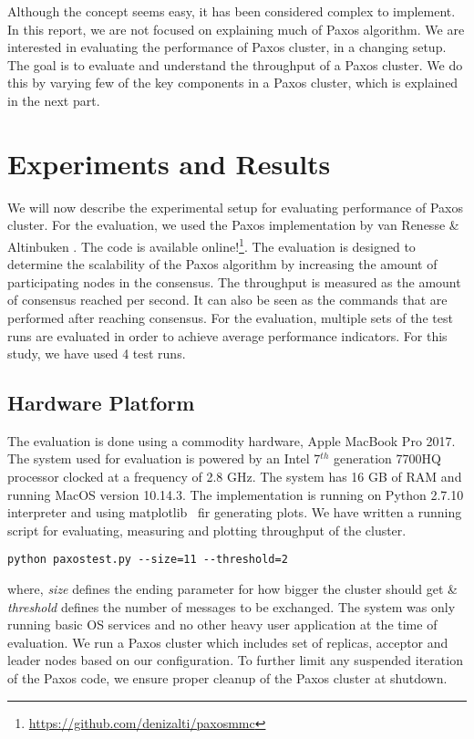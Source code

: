 \documentclass[conference]{IEEEtran}
\begin{document}
Although the concept seems easy, it has been considered complex to implement. 
In this report, we are not focused on explaining much of Paxos algorithm. 
We are interested in evaluating the performance of Paxos cluster, in a changing setup. 
The goal is to evaluate and understand the throughput of a Paxos cluster. 
We do this by varying few of the key components in a Paxos cluster, which is explained in the next part. 
\section{Experiments and Results}
We will now describe the experimental setup for evaluating performance of Paxos cluster. 
For the evaluation, we used the Paxos implementation by van Renesse \& Altinbuken \cite{b3}. 
The code is available online!\footnote{\url{https://github.com/denizalti/paxosmmc}}. 
The evaluation is designed to determine the scalability of the Paxos algorithm by increasing the amount of participating nodes in the consensus. 
The throughput is measured as the amount of consensus reached per second. 
It can also be seen as the commands that are performed after reaching consensus. 
For the evaluation, multiple sets of the test runs are evaluated in order to achieve average performance indicators. 
For this study, we have used 4 test runs. 

\subsection{Hardware Platform}
The evaluation is done using a commodity hardware, Apple MacBook Pro 2017. 
The system used for evaluation is powered by an Intel 7$^{th}$ generation 7700HQ processor clocked at a frequency of 2.8 GHz. 
The system has 16 GB of RAM and running MacOS version 10.14.3. 
The implementation is running on Python 2.7.10 interpreter and using matplotlib~\cite{b4} fir generating plots. 
We have written a running script for evaluating, measuring and plotting throughput of the cluster. 

\begin{verbatim}
python paxostest.py --size=11 --threshold=2
\end{verbatim}
where, \textit{size} defines the ending parameter for how bigger the cluster should get \& \textit{threshold} defines the number of messages to be exchanged. 
The system was only running basic OS services and no other heavy user application at the time of evaluation. 
We run a Paxos cluster which includes set of replicas, acceptor and leader nodes based on our configuration. 
To further limit any suspended iteration of the Paxos code, we ensure proper cleanup of the Paxos cluster at shutdown. 
\\
\end{document}
